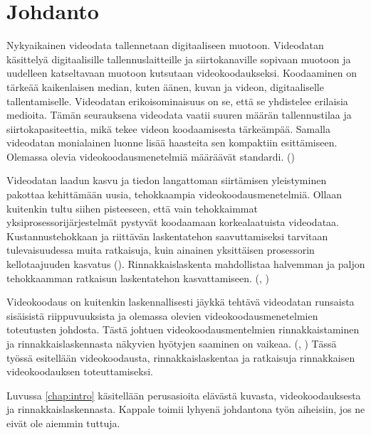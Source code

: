 
\section{Johdanto}

Nykyaikainen videodata tallennetaan digitaaliseen muotoon. Videodatan
käsittelyä digitaalisille tallennuslaitteille ja siirtokanaville sopivaan
muotoon ja uudelleen katseltavaan muotoon kutsutaan videokoodaukseksi.
Koodaaminen on tärkeää kaikenlaisen median, kuten äänen, kuvan ja videon,
digitaaliselle tallentamiselle. Videodatan erikoisominaisuus on se, että
se yhdistelee erilaisia medioita. Tämän seurauksena videodata vaatii suuren
määrän tallennustilaa ja siirtokapasiteettia, mikä tekee videon koodaamisesta
tärkeämpää. Samalla videodatan monialainen luonne lisää haasteita sen
kompaktiin esittämiseen. Olemassa olevia videokoodausmenetelmiä määräävät
standardi. (\citealt{h264})

Videodatan laadun kasvu ja tiedon langattoman siirtämisen yleistyminen pakottaa
kehittämään uusia, tehokkaampia videokoodausmenetelmiä. Ollaan kuitenkin tultu
siihen pisteeseen, että vain tehokkaimmat yksiprosessorijärjestelmät pystyvät
koodaamaan korkealaatuista videodataa. Kustannustehokkaan ja riittävän
laskentatehon saavuttamiseksi tarvitaan tulevaisuudessa muita ratkaisuja, kuin
ainainen yksittäisen prosessorin kellotaajuuden kasvatus (\citealt{moore}). Rinnakkaislaskenta
mahdollistaa halvemman ja paljon tehokkaamman ratkaisun laskentatehon
kasvattamiseen. (\citealt{xu}, \citealt{chi})

Videokoodaus on kuitenkin laskennallisesti jäykkä tehtävä videodatan runsaista
sisäisistä riippuvuuksista ja olemassa olevien videokoodausmenetelmien
toteutusten johdosta. Tästä johtuen videokoodausmentelmien rinnakkaistaminen ja
rinnakkaislaskennasta näkyvien hyötyjen saaminen on vaikeaa.
(\citealt{pieters}, \citealt{li}) Tässä työssä esitellään videokoodausta,
rinnakkaislaskentaa ja ratkaisuja rinnakkaisen videokoodauksen toteuttamiseksi.

Luvussa \ref{chap:intro} käsitellään perusasioita elävästä kuvasta,
videokoodauksesta ja rinnakkaislaskennasta. Kappale toimii lyhyenä johdantona
työn aiheisiin, jos ne eivät ole aiemmin tuttuja.

